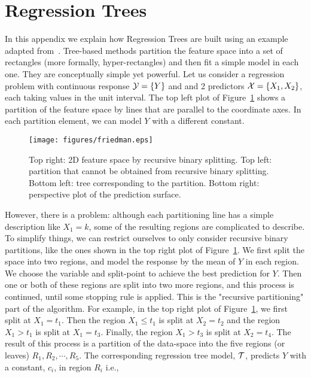 \section{Regression Trees}
\label{A:RegTrees}
\textcolor[rgb]{0,0,1}{
In this appendix we explain how Regression Trees are built using an example adapted from~\cite{hastie2009elements}.
Tree-based methods partition the feature space into a set of rectangles (more formally, hyper-rectangles) and then fit a simple model in each one. They are conceptually simple yet powerful.
Let us consider a regression problem with continuous response $\mathcal{Y} = \{Y\}$ and and 2 predictors $\mathcal{X} = \{X_1,X_2\}$, each taking values in the unit interval. The top left plot of Figure~\ref{fig:friedman} shows a partition of the feature space by lines that are parallel to the coordinate axes. In each partition element, we can model $Y$ with a different constant.
\begin{figure}
  \centering
  \texttt{[image: figures/friedman.eps]}
  \vspace{-8pt}
  \caption{Top right: 2D feature space by recursive binary splitting. Top left: partition that cannot be obtained from recursive binary splitting. Bottom left: tree corresponding to the partition. Bottom right:  perspective plot of the prediction surface.}
  \label{fig:friedman}
   \vspace{-10pt}
\end{figure} 
However, there is a problem: although each partitioning line has a simple description like $X_1 = k$, some of the resulting regions are complicated to describe.
To simplify things, we can restrict ourselves to only consider recursive binary partitions, like the ones shown in the top right plot of Figure~\ref{fig:friedman}.
We first split the space into two regions, and model the response by the mean of $Y$ in each region. 
We choose the variable and split-point to achieve the best prediction for $Y$. 
Then one or both of these regions are split into two more regions, and this process is continued, until some stopping rule is applied. This is the "recursive partitioning" part of the  algorithm. 
For example, in the top right plot of Figure~\ref{fig:friedman}, we first split at $X_1 = t_1$. 
Then the region $X_1 \leq t_1$ is split at $X_2 = t_2$ and the region $X_1 > t_1$ is split at $X_1 = t_3$.
Finally, the region $X_1 > t_3$ is split at $X_2 = t_4$. 
The result of this process is a partition of the data-space into the five regions (or leaves) $R_1, R_2,\cdots, R_5$.
The corresponding regression tree model, $\mathcal{T}$, predicts $Y$ with a constant, $c_i$, in region $R_i$ i.e.,
}
